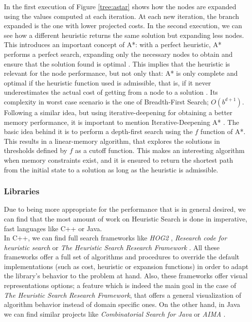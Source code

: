 In the first execution of Figure \ref{tree:astar} shows how the nodes are
expanded using the values computed at each iteration. At each new iteration,
the branch expanded is the one with lower projected costs. In the second
execution, we can see how a different heuristic returns the same solution but
expanding less nodes. This introduces an important concept of A*: with a
perfect heuristic, A* performs a perfect search, expanding only the necessary
nodes to obtain and ensure that the solution found is optimal
\cite{dechter-1985-astar}. This implies that the heuristic is relevant for the
node performance, but not only that: A* is only complete and optimal if the
heuristic function used is admissible, that is, if it never underestimates the
actual cost of getting from a node to a solution \cite{pearl-1984-heuristics}.
Its complexity in worst case scenario is the one of Breadth-First Search;
$O(b^{d+1})$.\\

Following a similar idea, but using iterative-deepening for obtaining a better
memory performance, it is important to mention Iterative-Deepening A*
\cite{korf-1985-depth}. The basic idea behind it is to perform a depth-first
search using the $f$ function of A*. This results in a linear-memory algorithm,
that explores the solutions in thresholds defined by $f$ as a cutoff function.
This makes an interesting algorithm when memory constraints exist, and it is
ensured to return the shortest path from the initial state to a solution as
long as the heuristic is admissible.\\
\subsubsection{Libraries}

Due to being more appropriate for the performance that is in general desired,
we can find that the most amount of work on Heuristic Search is done in
imperative, fast languages like C++ or Java.\\

In C++, we can find full search frameworks like \emph{HOG2} \cite{hog2},
\emph{Research code for heuristic search} \cite{cpp-search} or \emph{The
  Heuristic Search Research Framework} \cite{goldenberg-2017-framework}. All
these frameworks offer a full set of algorithms and procedures to override the
default implementations (such as cost, heuristic or expansion functions) in
order to adapt the library's behavior to the problem at hand. Also, these
frameworks offer visual representations options; a feature which is indeed the
main goal in the case of \emph{The Heuristic Search Research Framework}, that
offers a general visualization of algorithm behavior instead of domain specific
ones. On the other hand, in Java we can find similar projects like
\emph{Combinatorial Search for Java} \cite{cs4j} or \emph{AIMA}
\cite{java-aima}.\\

